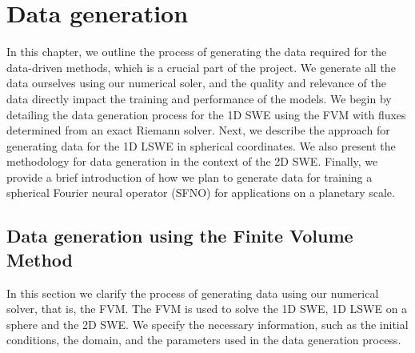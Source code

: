 \chapter{Data generation}\label{ch:method}
In this chapter, we outline the process of generating the data required for the data-driven methods, which is a crucial part of the project.
We generate all the data ourselves using our numerical soler, and the quality and relevance of the data directly impact the training and performance of the models.
We begin by detailing the data generation process for the 1D SWE using the FVM with fluxes determined from an exact Riemann solver.
Next, we describe the approach for generating data for the 1D LSWE in spherical coordinates.
We also present the methodology for data generation in the context of the 2D SWE.
Finally, we provide a brief introduction of how we plan to generate data for training a spherical Fourier neural operator (SFNO) for applications on a planetary scale.

\section{Data generation using the Finite Volume Method}\label{sec:data_generation_fvm}
In this section we clarify the process of generating data using our numerical solver, that is, the FVM.
The FVM is used to solve the 1D SWE, 1D LSWE on a sphere and the 2D SWE.
We specify the necessary information, such as the initial conditions, the domain, and the parameters used in the data generation process.

